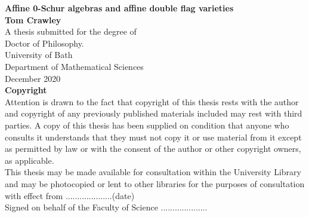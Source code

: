 \begin{titlepage}
\begin{center}
\vspace*{1cm}
\Huge
\textbf{Affine 0-Schur algebras and affine double flag varieties}\\
\vspace{0.7cm}
\Large
\textbf{Tom Crawley}\\
\vfill
A thesis submitted for the degree of\\
Doctor of Philosophy.\\
\vspace{0.7cm}
\large
University of Bath\\
Department of Mathematical Sciences\\
December 2020\\

\vspace{0.7cm}
\normalsize
\textbf{Copyright}\\
\vspace{0.7cm}
Attention is drawn to the fact that copyright of this thesis rests with the author and copyright of any previously published materials included may rest with third parties. A copy of this thesis has been supplied on condition that anyone who consults it understands that they must not copy it or use material from it except as permitted by law or with the consent of the author or other copyright owners, as applicable.\\

\vspace{0.7cm}
This thesis may be made available for consultation within the University Library and may be photocopied or lent to other libraries for the purposes of consultation with effect from ....................(date)\\
Signed on behalf of the Faculty of Science ....................\\
\end{center}
\end{titlepage}